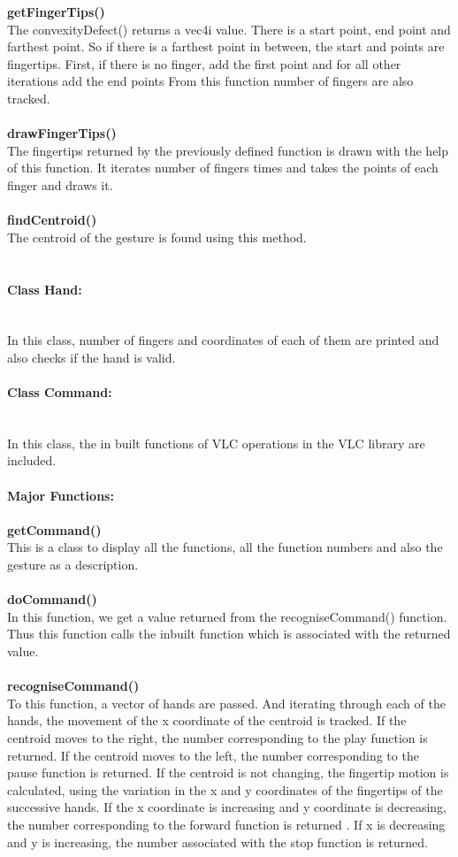 \documentclass[a4paper,11pt]{article}
\newcommand{\mparagraph}[1]{\paragraph{#1}\mbox{}\\}
\begin{document}
					     \textbf{getFingerTips()\\}
					     	The convexityDefect() returns a vec4i value. There is a start point, end point and farthest point. So if there is a farthest point in between, the start and points are fingertips. First, if there is no finger, add the first point and for all other iterations add the end points From this function number of fingers are also tracked.\\\\
					     \textbf{drawFingerTips()\\}
					     	The fingertips returned by the previously defined function is drawn with the help of this function. It iterates number of fingers times and takes the points of each finger and draws it.\\\\
    					 \textbf{findCentroid()\\}
    					 	The centroid of the gesture is found using this method.\\\\
    				\mparagraph{Class Hand:\\}
    					In this class, number of fingers and coordinates of each of them are printed and also checks if the hand is valid.
    				\mparagraph{Class Command: \\}
    					In this class, the in built functions of VLC operations in the VLC library are included. \\\\
    					\textbf{Major Functions: \\\\}
    					\textbf{getCommand()\\}
    						This is a class to display all the functions, all the function numbers and also the gesture as a description.\\\\
    					\textbf{doCommand()\\}
    						In this function, we get a value returned from the recogniseCommand() function. Thus this function calls the inbuilt function which is associated with the returned value.\\\\
    					\textbf{recogniseCommand()\\}
    						To this function, a vector of hands are passed. And iterating through each of the hands, the movement of the x coordinate of the centroid is tracked. If the centroid moves to the right, the number corresponding to the play function is returned. If the centroid moves to the left, the number corresponding to the pause function is returned.
    						If the centroid is not changing, the fingertip motion is calculated, using the variation in the x and y coordinates of the fingertips of the successive hands. If the x coordinate is increasing and y coordinate is decreasing, the number corresponding to the forward function is returned . If x is decreasing and y is increasing, the number associated with the stop function is returned.
\end{document}
